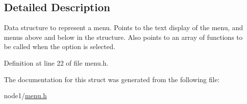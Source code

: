 \subsection{Detailed Description}
Data structure to represent a menu. Points to the text display of the menu, and menus above and below in the structure. Also points to an array of functions to be called when the option is selected. 

Definition at line 22 of file menu.\+h.



The documentation for this struct was generated from the following file\+:\begin{DoxyCompactItemize}
\item 
node1/\hyperlink{menu_8h}{menu.\+h}\end{DoxyCompactItemize}
